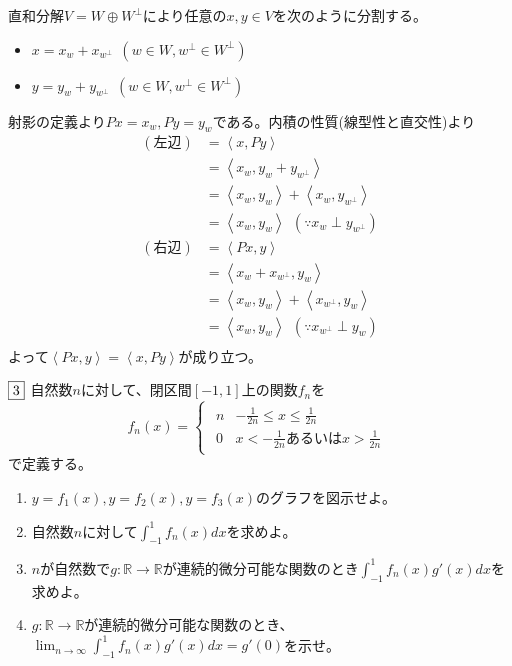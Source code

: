 \documentclass[dvipdfmx]{jsreport}
\newcommand{\R}{\mathbb{R}}
\newcommand{\innerproduct}[2]{\left\langle{#1}, {#2}\right\rangle}
\newcounter{num}[section]
\begin{document}
\begin{answer}
\begin{enumerate}
\begin{enumerate_roman}
	\item 直和分解$V= W\oplus W^\perp$により任意の$x, y\in V$を次のように分割する。
\begin{itemize}
	\item $x= x_w+ x_{w^\perp}\ \ (w\in W, w^\perp\in W^\perp)$
	\item $y= y_w+ y_{w^\perp}\ \ (w\in W, w^\perp\in W^\perp)$
\end{itemize}
	射影の定義より$Px= x_w, Py= y_w$である。内積の性質(線型性と直交性)より
\begin{align*}
	(左辺)
	&= \innerproduct{x}{Py}\\	
	&= \innerproduct{x_w}{y_w+ y_{w^\perp}}\\
	&= \innerproduct{x_w}{y_w}+ \innerproduct{x_w}{y_{w^\perp}}\\
	&= \innerproduct{x_w}{y_w}\ \ (\because x_w\perp y_{w^\perp})\\
	(右辺)
	&= \innerproduct{Px}{y}\\	
	&= \innerproduct{x_w+ x_{w^\perp}}{y_w}\\
	&= \innerproduct{x_w}{y_w}+ \innerproduct{x_{w^\perp}}{y_w}\\
	&= \innerproduct{x_w}{y_w}\ \ (\because x_{w^\perp}\perp y_w)\\
\end{align*}
	よって$\innerproduct{Px}{y}= \innerproduct{x}{Py}$が成り立つ。
\end{enumerate_roman}
\end{enumerate}
\end{answer}

\begin{tcolorbox} %
	$\fbox{3}$ 自然数$n$に対して、閉区間$[-1, 1]$上の関数$f_n$を
\begin{equation*}
	f_n(x)=
\begin{cases}
\begin{matrix}
	n& -\frac{1}{2n}\le x\le \frac{1}{2n}\\
	0& x< -\frac{1}{2n}あるいは x> \frac{1}{2n}
\end{matrix}
\end{cases}
\end{equation*}
	で定義する。
\begin{enumerate}
	\item $y= f_1(x), y= f_2(x), y= f_3(x)$のグラフを図示せよ。
	\item 自然数$n$に対して$\int_{-1}^1 f_n(x) dx$を求めよ。
	\item $n$が自然数で$g\colon \R\to \R$が連続的微分可能な関数のとき$\int_{-1}^1 f_n(x)g'(x) dx$を求めよ。
	\item $g\colon \R\to \R$が連続的微分可能な関数のとき、$\lim_{n\to \infty}\int _{-1}^1 f_n(x)g'(x) dx= g'(0)$を示せ。
\end{enumerate}
\end{tcolorbox}
\end{document}
